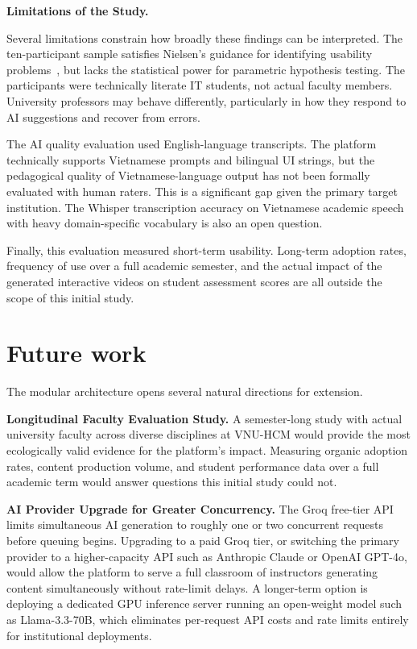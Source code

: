 \textbf{Limitations of the Study.}

Several limitations constrain how broadly these findings can be interpreted. The ten-participant sample satisfies Nielsen's guidance for identifying usability problems~\cite{nielsen1994}, but lacks the statistical power for parametric hypothesis testing. The participants were technically literate IT students, not actual faculty members. University professors may behave differently, particularly in how they respond to AI suggestions and recover from errors.

The AI quality evaluation used English-language transcripts. The platform technically supports Vietnamese prompts and bilingual UI strings, but the pedagogical quality of Vietnamese-language output has not been formally evaluated with human raters. This is a significant gap given the primary target institution. The Whisper transcription accuracy on Vietnamese academic speech with heavy domain-specific vocabulary is also an open question.

Finally, this evaluation measured short-term usability. Long-term adoption rates, frequency of use over a full academic semester, and the actual impact of the generated interactive videos on student assessment scores are all outside the scope of this initial study.

\section{Future work}

The modular architecture opens several natural directions for extension.

\textbf{Longitudinal Faculty Evaluation Study.} A semester-long study with actual university faculty across diverse disciplines at VNU-HCM would provide the most ecologically valid evidence for the platform's impact. Measuring organic adoption rates, content production volume, and student performance data over a full academic term would answer questions this initial study could not.

\textbf{AI Provider Upgrade for Greater Concurrency.} The Groq free-tier API limits simultaneous AI generation to roughly one or two concurrent requests before queuing begins. Upgrading to a paid Groq tier, or switching the primary provider to a higher-capacity API such as Anthropic Claude or OpenAI GPT-4o, would allow the platform to serve a full classroom of instructors generating content simultaneously without rate-limit delays. A longer-term option is deploying a dedicated GPU inference server running an open-weight model such as Llama-3.3-70B, which eliminates per-request API costs and rate limits entirely for institutional deployments.

